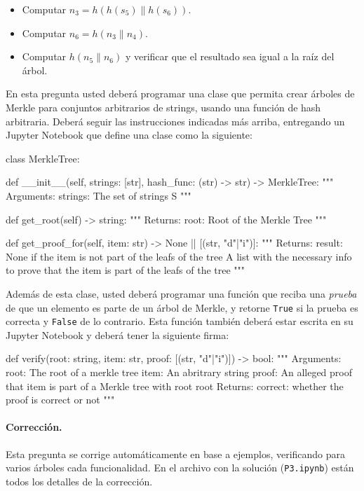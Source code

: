 \begin{itemize}
  \item Computar $n_3=h(h(s_5)\|h(s_6))$.
  \item Computar $n_6=h(n_3\|n_4)$.
  \item Computar $h(n_5\|n_6)$ y verificar que el resultado sea igual a la raíz del árbol.
\end{itemize}

En esta pregunta usted deberá programar una clase que permita crear árboles de Merkle para conjuntos arbitrarios de strings, usando una función de hash arbitraria. Deberá seguir las instrucciones indicadas más arriba, entregando un Jupyter Notebook que define una clase como la siguiente:

\bigskip
\begin{python}
  class MerkleTree:
    
    def __init__(self, strings: [str], hash_func: (str) -> str) -> MerkleTree:
    """
    Arguments:
      strings: The set of strings S
    """

    def get_root(self) -> string:
    """
    Returns:
      root: Root of the Merkle Tree
    """

    def get_proof_for(self, item: str) -> None || [(str, "d"|"i")]:
    """
    Returns:
      result: None if the item is not part of the leafs of the tree
              A list with the necessary info to prove that the
              item is part of the leafs of the tree
    """
\end{python}

Además de esta clase, usted deberá programar una función que reciba una \emph{prueba} de que un elemento es parte de un árbol de Merkle, y retorne \texttt{True} si la prueba es correcta y \texttt{False} de lo contrario. Esta función también deberá estar escrita en su Jupyter Notebook y deberá tener la siguiente firma:

\bigskip
\begin{python}
  def verify(root: string, item: str, proof: [(str, "d"|"i")]) -> bool:
    """
    Arguments:
      root: The root of a merkle tree
      item: An abritrary string
      proof: An alleged proof that item is part of a Merkle
             tree with root root
    Returns:
      correct: whether the proof is correct or not
    """
\end{python}


\medskip

\paragraph{Corrección.} Esta pregunta se corrige automáticamente en base a ejemplos, verificando para varios árboles cada funcionalidad. En el archivo con la solución (\texttt{P3.ipynb}) están todos los detalles de la corrección.


\medskip

